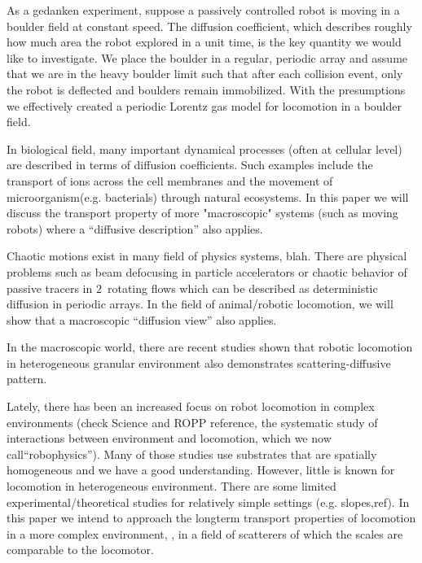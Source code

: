 %
%

As a gedanken experiment, suppose a passively controlled robot is moving
in a boulder field at constant speed. The diffusion coefficient, which
describes roughly how much area the robot explored in a unit time, is the
key quantity we would like to investigate. We place the boulder in a
regular, periodic array and assume that we are in the heavy boulder limit
such that after each collision event, only the robot is deflected and
boulders remain immobilized. With the presumptions we effectively created
a periodic Lorentz gas model for locomotion in a boulder
field.

In biological field,  many important dynamical processes (often at
cellular level) are described in  terms of diffusion coefficients. Such
examples include the transport of ions  across the cell
membranes and the movement of  microorganism(e.g.
bacterials) through natural  ecosystems. In this
paper we will discuss the transport  property of more "macroscopic"
systems (such as moving  robots) where a ``diffusive
description'' also applies.

Chaotic motions exist in many field of physics systems, blah. There are
physical problems such as beam defocusing in particle accelerators or
chaotic behavior of passive tracers in $2$\dmn\ rotating flows which can
be described as deterministic diffusion in periodic arrays. In the field
of animal/robotic locomotion, we will show that a macroscopic ``diffusion
view'' also applies.

In the macroscopic world, there are recent
studies shown that robotic locomotion in heterogeneous granular
environment also demonstrates scattering-diffusive pattern.

Lately, there has been an increased focus on robot locomotion in complex
environments (check Science and ROPP reference, the systematic study of
interactions between environment and locomotion, which we now
call``robophysics''). Many of those studies use substrates that are
spatially homogeneous and we have a good
understanding. However, little is
known for locomotion in heterogeneous environment. There are some limited
experimental/theoretical studies for relatively simple settings (e.g.
slopes,ref). In this paper we intend to approach the longterm transport
properties of locomotion in a more complex environment, \ie, in a field
of scatterers of which the scales are comparable to the locomotor.


